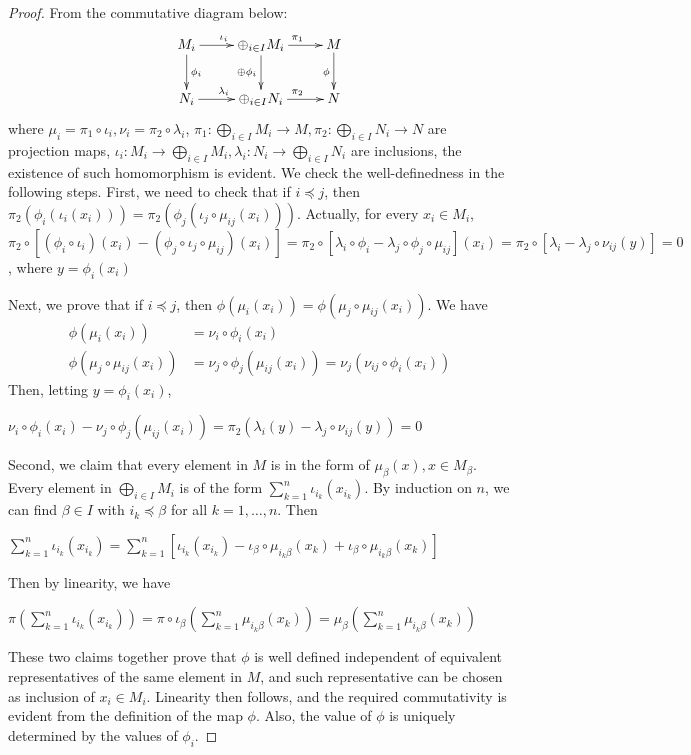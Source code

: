 \begin{proof}
From the commutative diagram below:
$$
\xymatrix{
M_i \ar[r]^{\iota_i} \ar[d]^{\phi_i}&\oplus_{i\in I} M_i\ar[r]^{\pi_1}
\ar[d]_{\oplus\phi_i}
& M \ar[d]_{\phi}\\
N_i \ar[r]^{\lambda_i} &\oplus_{i\in I} N_i \ar[r]^{\pi_2} &N
}
$$
where $\mu_{i} = \pi_1 \circ \iota_{i}, \nu_{i} = \pi_2 \circ \lambda_{i}$,
$\pi_1 : \bigoplus_{i\in I}M_i\rightarrow M,
\pi_2 : \bigoplus_{i\in I}N_i\rightarrow N$ are projection maps,
$\iota_i : M_i\rightarrow
\bigoplus_{i\in I}M_i, \lambda_{i} : N_i\rightarrow
\bigoplus_{i\in I}N_i$ are inclusions, the existence of such homomorphism is
evident. We check the
well-definedness in the following steps.
First, we need to check that if $i\preceq j$, then
$\pi_2(\phi_i(\iota_i(x_i))) = \pi_2(\phi_j(\iota_j\circ\mu_{ij}(x_i)))$.
Actually, for every $x_i\in M_i$, \\
$\pi_2\circ[(\phi_i\circ\iota_i)(x_i)-(\phi_j\circ\iota_j\circ\mu_{ij})(x_i)] =
\pi_2\circ[\lambda_i\circ\phi_i-\lambda_j\circ\phi_j\circ\mu_{ij}](x_i)
=\pi_2\circ[\lambda_i-\lambda_j\circ\nu_{ij}(y)] = 0$, where $y = \phi_i(x_i)$

\medskip\noindent
Next, we prove that if $i\preceq j$, then
$\phi(\mu_i(x_i)) = \phi(\mu_j\circ\mu_{ij}(x_i))$. We have
\begin{align}
\phi(\mu_i(x_i))&= \nu_i\circ\phi_i(x_i)\\
\phi(\mu_j\circ\mu_{ij}(x_i))&= \nu_j\circ\phi_j(\mu_{ij}(x_i))=
\nu_j(\nu_{ij}\circ\phi_i(x_i))
\end{align}
Then, letting $y = \phi_i(x_i)$,
\begin{center}
$\nu_i\circ\phi_i(x_i)-\nu_j\circ\phi_j(\mu_{ij}(x_i))=
\pi_2(\lambda_i(y)-\lambda_j\circ\nu_{ij}(y)) = 0$
\end{center}
Second, we claim that every element in $M$ is in the form of $\mu_{\beta}(x),
x\in M_{\beta}$. Every element in
$\bigoplus_{i\in I}M_i$ is of the form $\sum_{k = 1}^n \iota_{i_k}(x_{i_k})$. By
induction on $n$, we can find
$\beta\in I$ with $i_k\preceq\beta$ for all $k = 1, \ldots, n$. Then
\begin{center}
$\sum_{k = 1}^n
\iota_{i_k}(x_{i_k}) = \sum_{k = 1}^n
[\iota_{i_k}(x_{i_k}) - \iota_{\beta}\circ\mu_{i_{k}\beta}(x_k)
+ \iota_{\beta} \circ \mu_{i_{k}\beta}(x_k)]$
\end{center}
Then by linearity, we have
\begin{center}
$\pi( \sum_{k = 1}^n \iota_{i_k}(x_{i_k}))
= \pi \circ \iota_{\beta}(\sum_{k = 1}^n  \mu_{i_{k} \beta}(x_k))
= \mu_{\beta}(\sum_{k = 1}^n \mu_{i_{k}\beta}(x_k))$
\end{center}
These two claims together prove that $\phi$ is well defined independent of
equivalent representatives of the
same element in $M$, and such representative can be chosen as inclusion of
$x_i\in M_i$. Linearity then follows,
and the required commutativity is
evident from the definition of the map $\phi$.
Also, the value of $\phi$ is uniquely determined by the values of $\phi_i$.
\end{proof}

